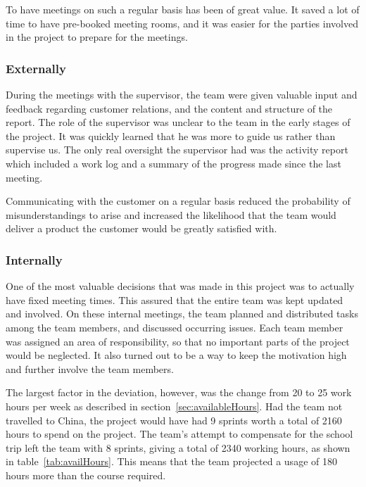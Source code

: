 To have meetings on such a regular basis has been of great value. It saved a lot of time to have pre-booked meeting rooms, and it was easier for the parties involved in the project to prepare for the meetings.
\subsubsection{Externally}
During the meetings with the supervisor, the team were given valuable input and feedback regarding customer relations, and the content and structure of the report. The role of the supervisor was unclear to the team in the early stages of the project. It was quickly learned that he was more to guide us rather than supervise us. The only real oversight the supervisor had was the activity report which included a work log and a summary of the progress made since the last meeting.

Communicating with the customer on a regular basis reduced the probability of misunderstandings to arise and increased the likelihood that the team would deliver a product the customer would be greatly satisfied with.
 
\subsubsection{Internally}
One of the most valuable decisions that was made in this project was to actually have fixed meeting times. This assured that the entire team was kept updated and involved. On these internal meetings, the team planned and distributed tasks among the team members, and discussed occurring issues. Each team member was assigned an area of responsibility, so that no important parts of the project would be neglected. It also turned out to be a way to keep the motivation high and further involve the team members.


The largest factor in the deviation, however, was the change from 20 to 25 work hours per week as described in section~\ref{sec:availableHours}. Had the team not travelled to China, the project would have had 9 sprints worth a total of 2160 hours to spend on the project. The team's attempt to compensate for the school trip left the team with 8 sprints, giving a total of 2340 working hours, as shown in table~\ref{tab:availHours}. This means that the team projected a usage of 180 hours more than the course required.

